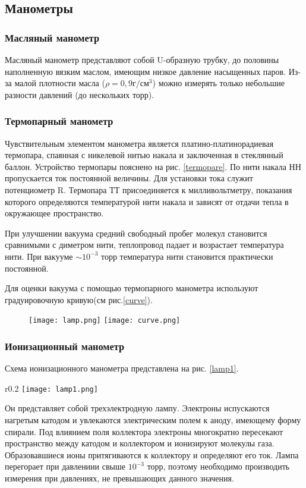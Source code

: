 \documentclass[a4paper,12pt]{article}
\theoremstyle{plain} %
\theoremstyle{definition} %
\theoremstyle{remark} %
\begin{document}
\subsection{Манометры}
\subsubsection{Масляный манометр}
Масляный манометр представляют собой U-образную трубку, до половины наполненную вязким маслом, имеющим низкое давление насыщенных паров. Из-за малой плотности масла ($\rho = 0,9 \textit{г/см$^3$}$) можно измерять только небольшие разности давлений (до нескольких торр). 
\subsubsection{Термопарный манометр}
Чувствительным элементом манометра является платино-платинорадиевая термопара, спаянная с никелевой нитью накала и заключенная в стеклянный баллон. Устройство термопары пояснено на рис. \ref{termopare}. По нити накала НН пропускается ток постоянной величины. Для установки тока служит потенциометр R. Термопара ТТ присоединяется к милливольтметру, показания которого определяются температурой нити накала и зависят от отдачи тепла в окружающее пространство. 

При улучшении вакуума средний свободный пробег молекул становится сравнимыми с диметром нити, теплопровод падает и возрастает температура нити. При вакууме $\sim 10^{-3}$ торр температура нити становится практически постоянной.

Для оценки вакуума с помощью термопарного манометра используют градуировочную кривую(см рис.\ref{curve}).
 \begin{figure}[H]
\begin{floatrow}
%
 {\texttt{[image: lamp.png]}}
%
{\texttt{[image: curve.png]}}         
\end{floatrow}
\end{figure}
\subsubsection{Ионизационный манометр}
Схема ионизационного манометра представлена на рис. \ref{lamp1}. 

\begin{wrapfigure}{r}{0.2\linewidth}\label{lamp1}
	\texttt{[image: lamp1.png]}
	\caption{Схема ионизационного манометра}
\end{wrapfigure}
Он представляет собой трехэлектродную лампу. Электроны испускаются нагретым катодом и увлекаются электрическим полем к аноду, имеющему форму спирали. Под влиянием поля коллектора электроны многократно пересекают пространство между катодом и коллектором и ионизируют молекулы газа. Образовавшиеся ионы притягиваются к коллектору и определяют  его ток. Лампа перегорает при  давлениии свыше $10^{-3}$ торр, поэтому необходимо производить измерения при давлениях, не превышающих данного значения.
\end{document}
